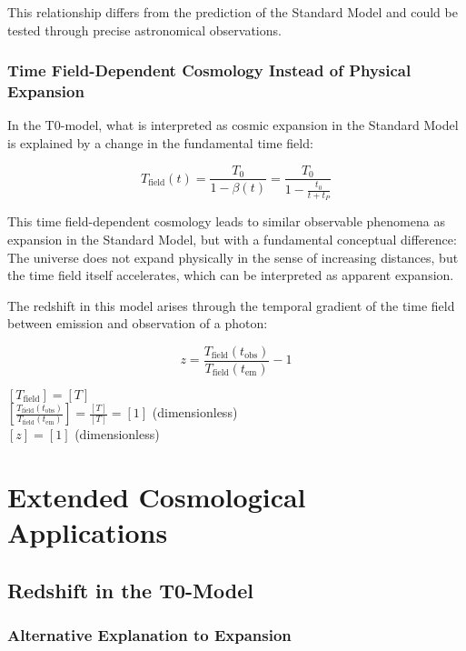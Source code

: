 \documentclass[12pt,a4paper]{article}
\theoremstyle{definition}
\begin{document}
	This relationship differs from the prediction of the Standard Model and could be tested through precise astronomical observations.\subsubsection{Time Field-Dependent Cosmology Instead of Physical Expansion}
	
	In the T0-model, what is interpreted as cosmic expansion in the Standard Model is explained by a change in the fundamental time field:
	
	\begin{equation}
		T_{\text{field}}(t) = \frac{T_0}{1 - \beta(t)} = \frac{T_0}{1 - \frac{t_0}{t + t_P}}
	\end{equation}
	
	This time field-dependent cosmology leads to similar observable phenomena as expansion in the Standard Model, but with a fundamental conceptual difference: The universe does not expand physically in the sense of increasing distances, but the time field itself accelerates, which can be interpreted as apparent expansion.
	
	The redshift in this model arises through the temporal gradient of the time field between emission and observation of a photon:
	
	\begin{equation}
		z = \frac{T_{\text{field}}(t_{\text{obs}})}{T_{\text{field}}(t_{\text{em}})} - 1
	\end{equation}
	
	\begin{einheitencheck}
		$[T_{\text{field}}] = [T]$ \checkmark\\
		$[\frac{T_{\text{field}}(t_{\text{obs}})}{T_{\text{field}}(t_{\text{em}})}] = \frac{[T]}{[T]} = [1]$ (dimensionless) \checkmark\\
		$[z] = [1]$ (dimensionless) \checkmark
	\end{einheitencheck}\section{Extended Cosmological Applications}
	
	\subsection{Redshift in the T0-Model}
	
	\subsubsection{Alternative Explanation to Expansion}
	
\end{document}

